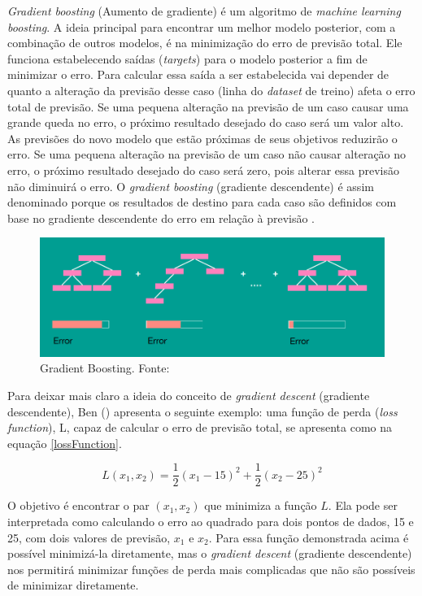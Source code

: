 \textit{Gradient boosting} (Aumento de gradiente) é um algoritmo de \textit{machine learning boosting}. A ideia principal para encontrar um melhor modelo posterior, com a combinação de outros modelos, é na minimização do erro de previsão total. Ele funciona estabelecendo saídas (\textit{targets}) para o modelo posterior a fim de minimizar o erro. Para calcular essa saída a ser estabelecida vai depender de quanto a alteração da previsão desse caso (linha do \textit{dataset} de treino) afeta o erro total de previsão. Se uma pequena alteração na previsão de um caso causar uma grande queda no erro, o próximo resultado desejado do caso será um valor alto. As previsões do novo modelo que estão próximas de seus objetivos reduzirão o erro. Se uma pequena alteração na previsão de um caso não causar alteração no erro, o próximo resultado desejado do caso será zero, pois alterar essa previsão não diminuirá o erro. O \textit{gradient boosting} (gradiente descendente) é assim denominado porque os resultados de destino para cada caso são definidos com base no gradiente descendente do erro em relação à previsão \cite{Hoare:2019}.

\begin{figure}[H]
    \centering
    \includegraphics[scale=0.4]{figuras/referencial_teorico/gradient_boosting.png}
    \caption[Gradient Boosting]{Gradient Boosting. Fonte: \cite{Chepenko:2019}}
    \label{fig:gradient_boosting}
\end{figure}
 
Para deixar mais claro a ideia do conceito de \textit{gradient descent} (gradiente descendente), Ben (\citeyear{Ben:2017}) apresenta o seguinte exemplo: uma função de perda (\textit{loss function}), L, capaz de calcular o erro de previsão total, se apresenta como na equação \eqref{lossFunction}.
 
 \begin{equation}\label{lossFunction}L(x_1, x_2)=\frac{1}{2}(x_1-15)^2+\frac{1}{2}(x_2-25)^2\end{equation}

O objetivo é encontrar o par \((x_1, x_2)\) que minimiza a função \(L\). Ela pode ser interpretada como calculando o erro ao quadrado para dois pontos de dados, 15 e 25, com dois valores de previsão, \(x_1\) e \(x_2\). Para essa função demonstrada acima é possível minimizá-la diretamente, mas o \textit{gradient descent} (gradiente descendente) nos permitirá minimizar funções de perda mais complicadas que não são possíveis de minimizar diretamente.
